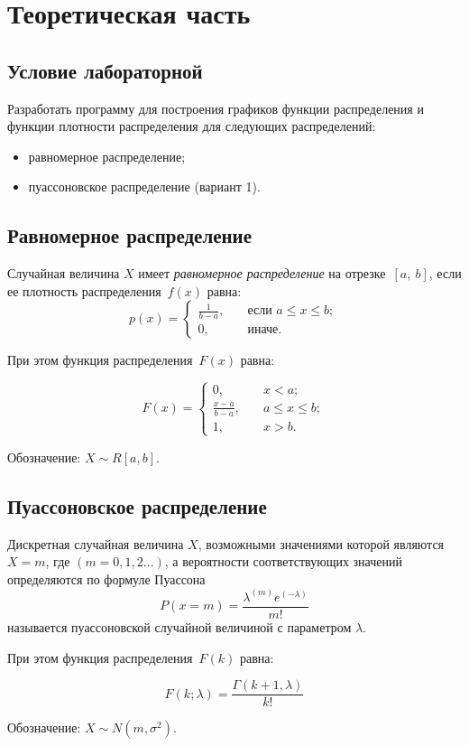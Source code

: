 \chapter{Теоретическая часть}


\section{Условие лабораторной}

Разработать программу для построения графиков функции распределения и функции плотности распределения для следующих распределений: 
\begin{itemize}
	\item равномерное распределение;
	\item пуассоновское распределение (вариант 1).
\end{itemize} 

\section{Равномерное распределение}

Случайная величина $X$ имеет \textit{равномерное распределение} на отрезке~$[a,~b]$, если ее плотность распределения~$f(x)$ равна:
\begin{equation}
	p(x) =
	\begin{cases}
		\displaystyle\frac{1}{b - a}, & \quad \text{если } a \leq x \leq b;\\
		0,  & \quad \text{иначе}.
	\end{cases}
\end{equation}

При этом функция распределения~$F(x)$ равна:

\begin{equation}
	F(x) =
	\begin{cases}
		0,  & \quad x < a;\\
		\displaystyle\frac{x - a}{b - a}, & \quad a \leq x \leq b;\\
		1,  & \quad x > b.
	\end{cases}
\end{equation}

Обозначение: $X \sim R[a, b]$.

\clearpage

\section{Пуассоновское распределение}

Дискретная случайная величина $X$, возможными значениями которой являются $X=m$, где $(m=0,1,2...)$, а вероятности соответствующих значений определяются по формуле Пуассона
\begin{equation}
	P(x = m) = \frac{\lambda^{(m)} e^{(-\lambda)}}{m!}	
\end{equation}
называется пуассоновской случайной величиной с параметром $\lambda$.

При этом функция распределения~$F(k)$ равна:

\begin{equation}
	F(k; \lambda) = \frac{\Gamma(k+1, \lambda)}{k!}
\end{equation}



Обозначение: $X \sim N(m, \sigma^2)$.


